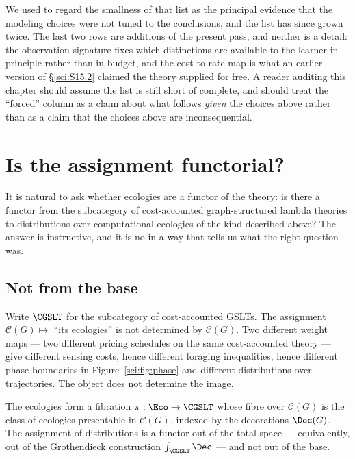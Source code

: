 We used to regard the smallness of that list as the principal evidence that the modeling choices were
not tuned to the conclusions, and the list has since grown twice. The last two rows are additions of
the present pass, and neither is a detail: the observation signature fixes which distinctions are
available to the learner in principle rather than in budget, and the cost-to-rate map is what an
earlier version of \S\ref{sci:S15.2} claimed the theory supplied for free. A reader auditing this
chapter should assume the list is still short of complete, and should treat the ``forced'' column as a
claim about what follows \emph{given} the choices above rather than as a claim that the choices above
are inconsequential.

\section{Is the assignment functorial?}\label{sci:S15}
\label{sci:sec:functor}

It is natural to ask whether ecologies are a functor of the theory: is there a functor from the
subcategory of cost-accounted graph-structured lambda theories to distributions over computational
ecologies of the kind described above? The answer is instructive, and it is no in a way that tells us
what the right question was.

\subsection{Not from the base}\label{sci:S15.1}

Write $\CGSLT$ for the subcategory of cost-accounted GSLTs. The assignment
$\mathcal{C}(G) \mapsto$ ``its ecologies'' is not determined by $\mathcal{C}(G)$. Two different weight
maps --- two different pricing schedules on the same cost-accounted theory --- give different sensing
costs, hence different foraging inequalities, hence different phase boundaries in
Figure~\ref{sci:fig:phase} and different distributions over trajectories. The object does not determine
the image.

\begin{proposition}
\label{sci:prop:fibration}
The ecologies form a fibration $\pi : \Eco \to \CGSLT$ whose fibre over $\mathcal{C}(G)$ is the class
of ecologies presentable in $\mathcal{C}(G)$, indexed by the decorations $\Dec(G)$. The assignment of
distributions is a functor out of the total space --- equivalently, out of the Grothendieck
construction $\textstyle\int_{\CGSLT} \Dec$ --- and not out of the base.
\end{proposition}

